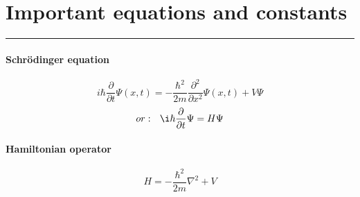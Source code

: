 \section*{Important equations and constants}
\vspace{-15pt}\noindent\rule{\textwidth}{0.1pt}\vspace{-10pt}
    \paragraph{Schrödinger equation}
    \[
        i\hbar\dfrac{\partial}{\partial t}\Psi(x,t)=-\frac{\hbar^2}{2m}\frac{\partial^2}{\partial x ^2}\Psi(x,t)+V\Psi
    \]
    \[
        or:~~
        \i\hbar\dfrac{\partial}{\partial t}\Psi=H\Psi
    \]
    \paragraph{Hamiltonian operator}
    \[
        H = -\dfrac{\hbar^2}{2m}\nabla^2 +V
    \]
    